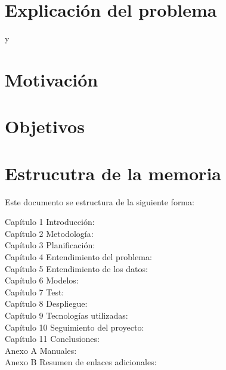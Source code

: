 \section{Explicación del problema}
\cite{CHEN1999} y \cite{FOURIE2002}

\section{Motivación}

\section{Objetivos}

\section{Estrucutra de la memoria}

Este documento se estructura de la siguiente forma:
\begin{description}
\item[Capítulo 1 Introducción:]
\item[Capítulo 2 Metodología:] 
\item[Capítulo 3 Planificación:]
\item[Capítulo 4 Entendimiento del problema:]
\item[Capítulo 5 Entendimiento de los datos:]
\item[Capítulo 6 Modelos:]
\item[Capítulo 7 Test:]
\item[Capítulo 8 Despliegue:]
\item[Capítulo 9 Tecnologías utilizadas:]
\item[Capítulo 10 Seguimiento del proyecto:]
\item[Capítulo 11 Conclusiones:]
\item[Anexo A Manuales:]
\item[Anexo B Resumen de enlaces adicionales:]
\end{description}
